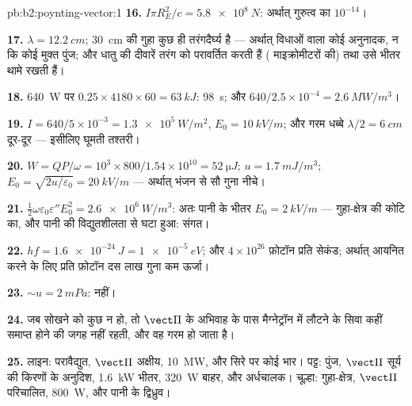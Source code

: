 \begin{solution}{pb:b2:poynting-vector:1}
\textbf{16.} $I\pi R_E^2/c = \qty{5.8e8}{N}$: अर्थात् गुरुत्व का $10^{-14}$।

\textbf{17.} $\lambda = \qty{12.2}{cm}$; \qty{30}{cm} की गुहा कुछ ही तरंगदैर्घ्य है
--- अर्थात् विधाओं वाला कोई अनुनादक, न कि कोई मुक्त पुंज; और धातु की दीवारें तरंग को
परावर्तित करती हैं ( माइक्रोमीटरों की) तथा उसे भीतर थामे रखती हैं।

\textbf{18.} \qty{640}{W} पर $0.25 \times 4180 \times 60 = \qty{63}{kJ}$: \qty{98}{s};
और $640/2.5 \times 10^{-4} = \qty{2.6}{MW/m^3}$।

\textbf{19.} $I = 640/5 \times 10^{-3} = \qty{1.3e5}{W/m^2}$, $E_0 = \qty{10}{kV/m}$; और गरम धब्बे
$\lambda/2 = \qty{6}{cm}$ दूर-दूर --- इसीलिए घूमती तश्तरी।

\textbf{20.} $W = QP/\omega = 10^3 \times 800/1.54 \times 10^{10} = \qty{52}{\micro J}$; $u =
\qty{1.7}{mJ/m^3}$; $E_0 = \sqrt{2u/\varepsilon_0} = \qty{20}{kV/m}$ --- अर्थात् भंजन से सौ गुना
नीचे।

\textbf{21.} $\tfrac12\omega\varepsilon_0\varepsilon''E_0^2 = \qty{2.6e6}{W/m^3}$: अतः पानी के भीतर
$E_0 = \qty{2}{kV/m}$ --- गुहा-क्षेत्र की कोटि का, और
पानी की विद्युतशीलता से घटा हुआ: संगत।

\textbf{22.} $hf = \qty{1.6e-24}{J} = \qty{1e-5}{eV}$; और $4 \times 10^{26}$ फ़ोटॉन प्रति सेकंड;
अर्थात् आयनित करने के लिए प्रति फ़ोटॉन दस लाख गुना कम ऊर्जा।

\textbf{23.} $\sim u = \qty{2}{mPa}$: नहीं।

\textbf{24.} जब सोखने को कुछ न हो, तो $\vect\Pi$ के अभिवाह के पास
मैग्नेट्रॉन में लौटने के सिवा कहीं समाप्त होने की जगह नहीं रहती, और वह गरम हो जाता है।

\textbf{25.} लाइन: परावैद्युत, $\vect\Pi$ अक्षीय, \qty{10}{MW}, और सिरे पर कोई
भार। पट्ट: पुंज, $\vect\Pi$ सूर्य की किरणों के अनुदिश, \qty{1.6}{kW}
भीतर, \qty{320}{W} बाहर, और अर्धचालक। चूल्हा: गुहा-क्षेत्र, $\vect\Pi$
परिचालित, \qty{800}{W}, और पानी के द्विध्रुव।
\end{solution}
